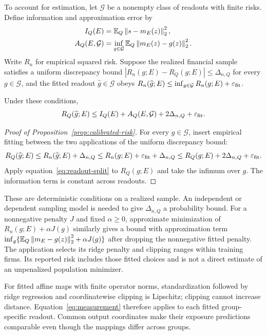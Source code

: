 \documentclass[11pt]{article}
\renewcommand{\lean}[1]{\ignorespaces}
\renewcommand{\leanok}{\ignorespaces}
\begin{document}
To account for estimation, let $\mathcal G$ be a nonempty class of readouts with
finite risks. Define information and approximation error by
\begin{align*}
  I_Q(E)&=\mathbb E_Q\left\lVert s-m_E(z)\right\rVert_2^2,\\
  A_Q(E,\mathcal G)&=\inf_{g\in\mathcal G}
  \mathbb E_Q\left\lVert m_E(z)-g(z)\right\rVert_2^2.
\end{align*}
Write $R_n$ for empirical squared risk. Suppose the realized financial sample
satisfies a uniform discrepancy bound
$|R_n(g;E)-R_Q(g;E)|\le\Delta_{n,Q}$ for every $g\in\mathcal G$, and the fitted
readout $\widehat g\in\mathcal G$ obeys
$R_n(\widehat g;E)\le\inf_{g\in\mathcal G}R_n(g;E)+\varepsilon_{\rm fit}$.
\begin{proposition}\label{prop:calibrated-risk}
  \lean{FreeFoundations.Score.calibrated_measurement_bound}\leanok{}
  Under these conditions,
  \begin{equation}\label{eq:learning-measurement}
    R_Q(\widehat g;E)\le I_Q(E)+A_Q(E,\mathcal G)
    +2\Delta_{n,Q}+\varepsilon_{\rm fit}.
  \end{equation}
\end{proposition}

\begin{proof}[Proof of Proposition~\ref{prop:calibrated-risk}]
  For every $g\in\mathcal G$, insert empirical fitting between the two
  applications of the uniform discrepancy bound:
  \[
    R_Q(\widehat g;E)\le R_n(\widehat g;E)+\Delta_{n,Q}
    \le R_n(g;E)+\varepsilon_{\rm fit}+\Delta_{n,Q}
    \le R_Q(g;E)+2\Delta_{n,Q}+\varepsilon_{\rm fit}.
  \]
  Apply equation~\eqref{eq:readout-split} to $R_Q(g;E)$ and take the infimum
  over $g$. The information term is constant across readouts.
\end{proof}
These are deterministic conditions on a realized sample. An independent or
dependent sampling model is needed to give $\Delta_{n,Q}$ a probability bound.
For a nonnegative penalty $J$ and fixed $\alpha\ge0$, approximate
minimization of
$R_n(g;E)+\alpha J(g)$ similarly gives a bound with approximation term
$\inf_g\{\mathbb{E}_Q\left\lVert m_E-g(z)\right\rVert_2^2+\alpha J(g)\}$ after dropping the nonnegative
fitted penalty. The application selects its ridge penalty and clipping ranges
within training firms. Its reported risk includes those fitted choices and is
not a direct estimate of an unpenalized population minimizer.

For fitted affine maps with finite operator norms, standardization followed by
ridge regression and coordinatewise clipping is Lipschitz; clipping cannot
increase distance. Equation~\eqref{eq:measurement} therefore applies to each
fitted group-specific readout. Common output coordinates make their exposure
predictions comparable even though the mappings differ across groups.
\end{document}
